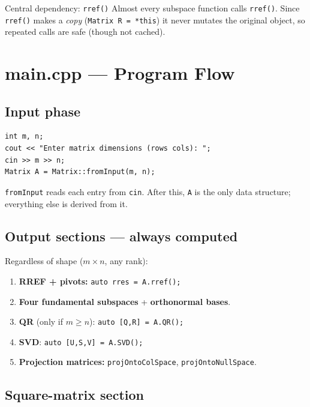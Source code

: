 \documentclass[12pt, a4paper]{article}
\newcommand{\code}[1]{\texttt{\small#1}}
\newcommand{\fn}[1]{\texttt{\small\color{funcgreen}#1}}
\begin{document}
\begin{notebox}{Central dependency: \fn{rref()}}
Almost every subspace function calls \fn{rref()}.  Since \fn{rref()} makes a
\emph{copy} (\code{Matrix R = *this}) it never mutates the original object,
so repeated calls are safe (though not cached).
\end{notebox}

\section{main.cpp --- Program Flow}

\subsection{Input phase}

\begin{lstlisting}
int m, n;
cout << "Enter matrix dimensions (rows cols): ";
cin >> m >> n;
Matrix A = Matrix::fromInput(m, n);
\end{lstlisting}

\fn{fromInput} reads each entry from \code{cin}.  After this, \code{A} is the
only data structure; everything else is derived from it.

\subsection{Output sections --- always computed}

Regardless of shape ($m \times n$, any rank):
\begin{enumerate}[noitemsep]
  \item \textbf{RREF + pivots:} \code{auto rres = A.rref();}
  \item \textbf{Four fundamental subspaces} + \textbf{orthonormal bases}.
  \item \textbf{QR} (only if $m \geq n$): \code{auto [Q,R] = A.QR();}
  \item \textbf{SVD}: \code{auto [U,S,V] = A.SVD();}
  \item \textbf{Projection matrices:} \fn{projOntoColSpace}, \fn{projOntoNullSpace}.
\end{enumerate}

\subsection{Square-matrix section}
\end{document}
